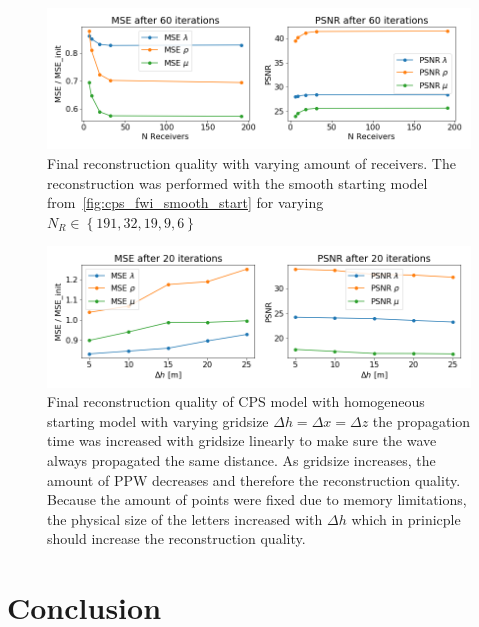 \documentclass[10pt]{SelfArx} %
\theoremstyle{definition}
\begin{document}
\begin{figure}[!h]\label{fig:cps_n_receiver_comparison}
\hspace*{-0.4in}
\includegraphics[width=1.15\textwidth]{fig/fwi_vs_n_receivers.png}
\caption{Final reconstruction quality with varying amount of receivers. The reconstruction was performed with the smooth starting model from~\cref{fig:cps_fwi_smooth_start} for varying $N_R \in \left\{191,32,19,9,6\right\}$}
\end{figure}

\begin{figure}[!h]\label{fig:cps_gridsize_comparison}
\hspace*{-0.4in}
\includegraphics[width=1.15\textwidth]{fig/fwi_vs_gridsize.png}
\caption{Final reconstruction quality of CPS model with homogeneous starting model with varying gridsize $\Delta h = \Delta x = \Delta z$ the propagation time was increased with gridsize linearly to make sure the wave always propagated the same distance. As gridsize increases, the amount of PPW decreases and therefore the reconstruction quality. Because the amount of points were fixed due to memory limitations, the physical size of the letters increased with $\Delta h$ which in prinicple should increase the reconstruction quality.}
\end{figure}

\clearpage

\section{Conclusion}
\end{document}
